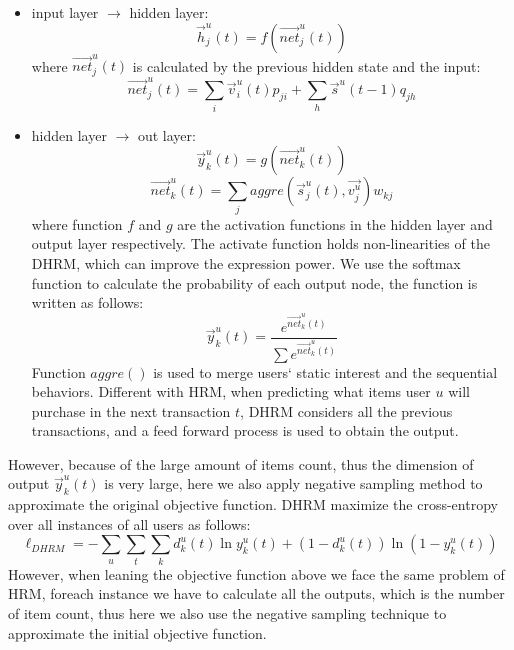 \documentclass[10pt,journal,compsoc]{IEEEtran}
\begin{document}
\begin{itemize}
\item input layer $\rightarrow$ hidden layer:\\
\begin{equation}
\vec{h}^u_j(t)=f(\vec{net}^u_j(t))
\end{equation}
where $\vec{net}^u_j(t)$ is calculated by the previous hidden state and the input:
\begin{equation}
\vec{net}^u_j(t)=\sum_i \vec{v}^u_i(t)p_{ji}+\sum_h \vec{s}^{u}(t-1)q_{jh}
\end{equation}
\item hidden layer $\rightarrow$ out layer:\\
\begin{equation}
\vec{y}^u_k(t)=g(\vec{net}^u_k(t))
\end{equation}
\begin{equation}
\vec{net}^u_k(t)=\sum_j aggre(\vec{s}^u_j(t),\vec{v^u_j})w_{kj}
\end{equation}
where function $f$ and $g$ are the activation functions in the hidden layer and output layer respectively. The activate function holds non-linearities of the DHRM, which can improve the expression power. We use the softmax function to calculate the probability of each output node, the function is written as follows:
\begin{equation}
\vec{y}^u_k(t)=\frac{e^{\vec{net}^u_k(t)}}{\sum e^{\vec{net}^u_k(t)}}
\end{equation}
Function $aggre()$ is used to merge users` static interest and the sequential behaviors. Different with HRM, when predicting what items user $u$ will purchase in the next transaction $t$, DHRM considers all the previous transactions, and a feed forward process is used to obtain the output.
\end{itemize}
 However, because of the large amount of items count, thus the dimension of output $\vec{y}^u_k(t)$ is very large, here we also apply negative sampling method to approximate the original objective function. DHRM maximize the cross-entropy over all instances of all users as follows:
\begin{displaymath}
\ell_{DHRM} = -\sum_u\sum_t\sum_k d^u_k(t)\ln y^u_k(t)+(1-d^u_k(t))\ln(1-y^u_k(t))
\end{displaymath}
However, when leaning the objective function above we face the same problem of HRM, foreach instance we have to calculate all the outputs, which is the number of item count, thus here we also use the negative sampling technique to approximate the initial objective function.
\end{document}
